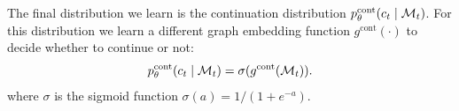 The final distribution we learn is the continuation distribution $p_\theta^\textrm{cont}(c_t \mid {\mathcal{M}}_{t})$.
For this distribution we learn a different graph embedding function $g^{\textrm{cont}}(\cdot)$ to decide whether to continue or not:
\begin{align}
p_\theta^\textrm{cont}(c_t \mid {\mathcal{M}}_t) = \sigma(g^{\textrm{cont}}({\mathcal{M}}_t)).
\end{align}
where $\sigma$ is the sigmoid function $\sigma(a) = 1/(1+e^{-a})$.






